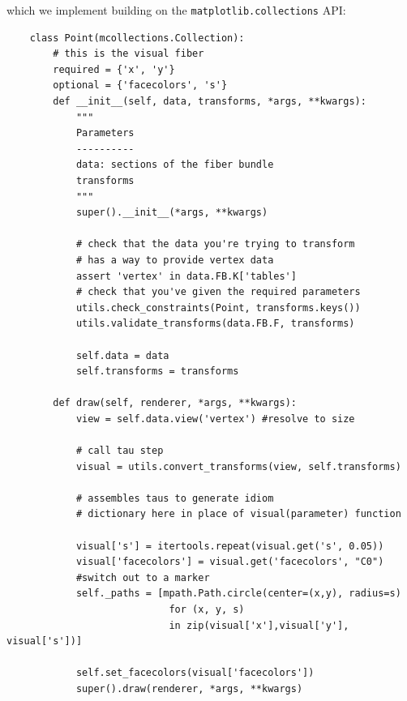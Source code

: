\documentclass[../main.tex]{subfiles}
\begin{document}
which we implement building on the \texttt{matplotlib.collections} API:

\begin{verbatim}
    class Point(mcollections.Collection):
        # this is the visual fiber 
        required = {'x', 'y'}
        optional = {'facecolors', 's'} 
        def __init__(self, data, transforms, *args, **kwargs):
            """
            Parameters
            ----------
            data: sections of the fiber bundle
            transforms
            """
            super().__init__(*args, **kwargs)
            
            # check that the data you're trying to transform 
            # has a way to provide vertex data  
            assert 'vertex' in data.FB.K['tables']
            # check that you've given the required parameters
            utils.check_constraints(Point, transforms.keys())
            utils.validate_transforms(data.FB.F, transforms)
    
            self.data = data
            self.transforms = transforms
    
        def draw(self, renderer, *args, **kwargs):
            view = self.data.view('vertex') #resolve to size
    
            # call tau step
            visual = utils.convert_transforms(view, self.transforms)
               
            # assembles taus to generate idiom
            # dictionary here in place of visual(parameter) function
           
            visual['s'] = itertools.repeat(visual.get('s', 0.05))
            visual['facecolors'] = visual.get('facecolors', "C0")
            #switch out to a marker 
            self._paths = [mpath.Path.circle(center=(x,y), radius=s)  
                            for (x, y, s) 
                            in zip(visual['x'],visual['y'], visual['s'])] 
           
            self.set_facecolors(visual['facecolors'])
            super().draw(renderer, *args, **kwargs)
    \end{verbatim}
    
    
\end{document}
